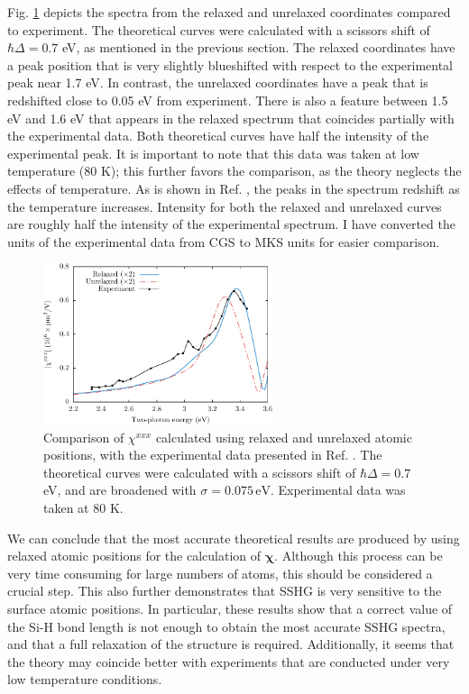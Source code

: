Fig. \ref{fig:Xxxx} depicts the spectra from the relaxed and unrelaxed
coordinates compared to experiment. The theoretical curves were calculated with
a scissors shift of $\hbar\Delta = 0.7$ eV, as mentioned in the previous
section. The relaxed coordinates have a peak position that is very slightly
blueshifted with respect to the experimental peak near 1.7 eV. In contrast, the
unrelaxed coordinates have a peak that is redshifted close to 0.05 eV from
experiment. There is also a feature between 1.5 eV and 1.6 eV that appears in
the relaxed spectrum that coincides partially with the experimental data. Both
theoretical curves have half the intensity of the experimental peak. It is
important to note that this data was taken at low temperature (80 K); this
further favors the comparison, as the theory neglects the effects of
temperature. As is shown in Ref. \cite{hoferAPA96}, the peaks in the spectrum
redshift as the temperature increases. Intensity for both the relaxed and
unrelaxed curves are roughly half the intensity of the experimental spectrum. I
have converted the units of the experimental data from CGS to MKS units for
easier comparison.

\begin{figure}[h]
\centering
\includegraphics[width=0.6\textwidth]{content/figures/fig-Si1x1-Hofer_Xxxx}
\caption{Comparison of
$\chi^{xxx}$ calculated using relaxed and unrelaxed
atomic positions, with the experimental data presented in Ref.
\cite{hoferAPA96}. The theoretical curves were calculated with a scissors shift
of $\hbar\Delta = 0.7$ eV, and are broadened with $\sigma=0.075\,\text{eV}$.
Experimental data was taken at 80 K.}
\label{fig:Xxxx}
\end{figure}

We can conclude that the most accurate theoretical results are produced by using
relaxed atomic positions for the calculation of $\boldsymbol{\chi}$. Although
this process can be very time consuming for large numbers of atoms, this should
be considered a crucial step. This also further demonstrates that SSHG is very
sensitive to the surface atomic positions. In particular, these results show
that a correct value of the Si-H bond length is not enough to obtain the most
accurate SSHG spectra, and that a full relaxation of the structure is required.
Additionally, it seems that the theory may coincide better with experiments that
are conducted under very low temperature conditions.


